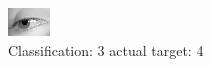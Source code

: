 \begin{figure}[h!]
\begin{center}
\includegraphics[width=0.60\columnwidth]{figures/ID3044_class_3_target_4.png}
\end{center}
\caption{ Classification: 3 actual target: 4}
\label{fig:ID3044_class_3_target_4}
\end{figure}
